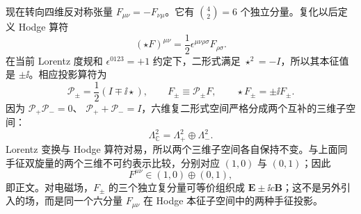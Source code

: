 \begin{derivation}
现在转向四维反对称张量 $F_{\mu\nu}=-F_{\nu\mu}$。它有
$\binom42=6$ 个独立分量。复化以后定义 Hodge 算符
\begin{equation*}
 (\star F)^{\mu\nu}
 =\frac12\epsilon^{\mu\nu\rho\sigma}F_{\rho\sigma}.
\end{equation*}
在当前 Lorentz 度规和 $\epsilon^{0123}=+1$ 约定下，二形式满足
$\star^2=-I$，所以其本征值是 $\pm\ii$。相应投影算符为
\begin{equation*}
 \mathcal P_\pm=\frac12(I\mp\ii\star),
 \qquad
 F_\pm\equiv\mathcal P_\pm F,
 \qquad
 \star F_\pm=\pm\ii F_\pm.
\end{equation*}
因为
$\mathcal P_+\mathcal P_-=0$、
$\mathcal P_++\mathcal P_-=I$，六维复二形式空间严格分成两个互补的三维子空间：
\begin{equation*}
 \Lambda^2_\mathbb C
 =\Lambda^2_+\oplus\Lambda^2_-.
\end{equation*}
Lorentz 变换与 Hodge 算符对易，所以两个三维子空间各自保持不变。与上面同手征双旋量的两个三维不可约表示比较，分别对应 $(1,0)$ 与 $(0,1)$；因此
\begin{equation*}
 F^{\mu\nu}\in(1,0)\oplus(0,1),
\end{equation*}
即正文。对电磁场，$F_\pm$ 的三个独立复分量可等价组织成 $\mathbf E\pm\ii c\mathbf B$；这不是另外引入的场，而是同一个六分量 $F_{\mu\nu}$ 在 Hodge 本征子空间中的两种手征投影。
\end{derivation}

